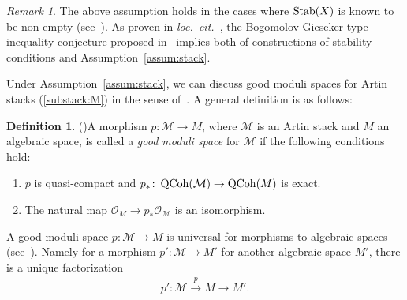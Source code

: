\documentclass[11pt]{amsart}
\theoremstyle{plain}
\theoremstyle{definition}
\newtheorem{defi}[thm]{Definition}
\theoremstyle{remark}
\newtheorem{rmk}[thm]{Remark}
\newcommand{\mM}{\mathcal{M}}
\newcommand{\oO}{\mathcal{O}}
\newcommand{\QCoh}{\mathop{\rm QCoh}\nolimits}
\newcommand{\Stab}{\mathop{\rm Stab}\nolimits}
\begin{document}
\begin{rmk}
The above assumption holds in the cases 
where $\Stab(X)$ is known to be non-empty
(see~\cite{PiYT}). 
As proven in \textit{loc.~cit.~}, 
the Bogomolov-Gieseker type inequality conjecture
proposed in~\cite{BMT, BMS}
implies both of constructions of stability conditions and 
Assumption~\ref{assum:stack}. 
\end{rmk}
Under Assumption~\ref{assum:stack},  
we can discuss good moduli spaces for 
Artin stacks (\ref{substack:M})
in the sense of~\cite{MR3237451}. 
A general definition is as follows: 
\begin{defi}(\cite{MR3237451})\label{def:goodmoduli}
A morphism $p \colon \mM \to M$, where $\mM$ is an 
Artin stack and $M$ an algebraic space, is called 
a \textit{good moduli 
space} for $\mM$ if the following conditions hold: 
\begin{enumerate}
\item $p$ is quasi-compact and $p_{\ast} \colon \QCoh(\mM) \to \QCoh(M)$
is exact. 
\item The natural map 
$\oO_M \to p_{\ast}\oO_{\mM}$ is an isomorphism.
\end{enumerate}
\end{defi}
A good moduli space $p \colon \mM \to M$ 
is universal for morphisms to algebraic spaces 
(see~\cite[Theorem~6.6]{MR3237451}). 
Namely for a morphism $p' \colon \mM \to M'$ 
for another algebraic space $M'$, there is a unique 
factorization
\begin{align*}
p' \colon \mM \stackrel{p}{\to} M \to M'. 
\end{align*}
\end{document}
